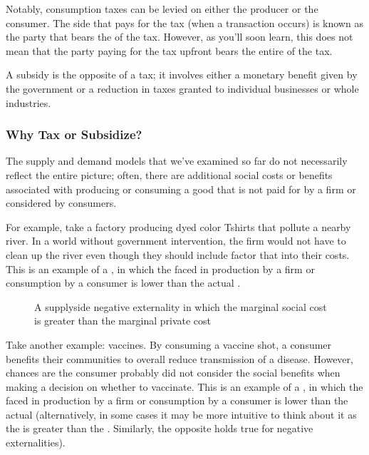 \documentclass[letterpaper,10pt,english]{jupyterBook}
\let\sphinxpxdimen\pdfpxdimen\else\newdimen\sphinxpxdimen
\begin{document}
\sphinxAtStartPar
Notably, consumption taxes can be levied on either the producer or the consumer. The side that pays for the tax  (when a transaction occurs) is known as the party that bears the  of the tax. However, as you’ll soon learn, this does not mean that the party paying for the tax upfront bears the entire  of the tax.

\sphinxAtStartPar
A subsidy is the opposite of a tax; it involves either a monetary benefit given by the government or a reduction in taxes granted to individual businesses or whole industries.


\subsubsection{Why Tax or Subsidize?}
\label{\detokenize{content/03-public/taxes-subsidies:why-tax-or-subsidize}}
\sphinxAtStartPar
The supply and demand models that we’ve examined so far do not necessarily reflect the entire picture; often, there are additional social costs or benefits associated with producing or consuming a good that is not paid for by a firm or considered by consumers.

\sphinxAtStartPar
For example, take a factory producing dyed color T\sphinxhyphen{}shirts that pollute a nearby river. In a world without government intervention, the firm would not have to clean up the river even though they should include factor that into their costs. This is an example of a , in which the  faced in production by a firm or consumption by a consumer is lower than the actual .

\begin{figure}[htbp]
\centering
\capstart

\noindent\sphinxincludegraphics[width=500\sphinxpxdimen]{{fig1-negative-externality}.png}
\caption{A supply\sphinxhyphen{}side negative externality in which the marginal social cost is greater than the marginal private cost}\label{\detokenize{content/03-public/taxes-subsidies:negative-externality}}\end{figure}

\sphinxAtStartPar
Take another example: vaccines. By consuming a vaccine shot, a consumer benefits their communities to overall reduce transmission of a disease. However, chances are the consumer probably did not consider the social benefits when making a decision on whether to vaccinate. This is an example of a , in which the  faced in production by a firm or consumption by a consumer is lower than the actual  (alternatively, in some cases it may be more intuitive to think about it as the  is greater than the . Similarly, the opposite holds true for negative externalities).
\end{document}
